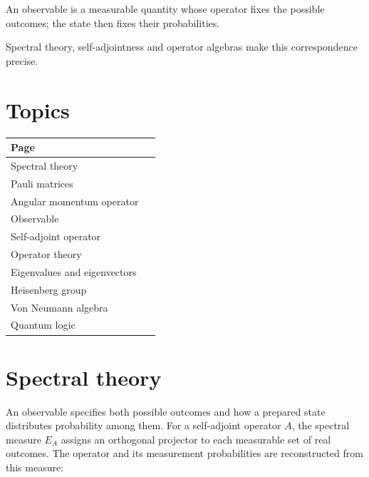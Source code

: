 \documentclass[11pt,oneside]{book}
\begin{document}
\begin{claimbox}

An observable is a measurable quantity whose operator fixes the possible outcomes; the state then fixes their probabilities.

\end{claimbox}

Spectral theory, self-adjointness and operator algebras make this correspondence precise.

\section*{Topics}

\begin{longtable}{p{0.92\linewidth}}
\toprule
Page \\
\midrule
\endhead
{}\label{page:spectral-theory}Spectral theory \\
\label{page:pauli-matrices}Pauli matrices \\
\label{page:angular-momentum-operator}Angular momentum operator \\
\label{page:observable}Observable \\
\label{page:self-adjoint-operator}Self-adjoint operator \\
\label{page:operator-theory}Operator theory \\
\label{page:eigenvalues-and-eigenvectors}Eigenvalues and eigenvectors \\
\label{page:heisenberg-group}Heisenberg group \\
\label{page:von-neumann-algebra}Von Neumann algebra \\
\label{page:quantum-logic}Quantum logic \\
\bottomrule
\end{longtable}

\clearpage

\section{Spectral theory}

\label{topic:spectral-theory}

An observable specifies both possible outcomes and how a prepared state distributes probability among them. For a self-adjoint operator \(A\), the spectral measure \(E_A\) assigns an orthogonal projector to each measurable set of real outcomes. The operator and its measurement probabilities are reconstructed from this measure:
\end{document}
